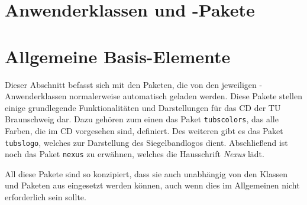 


\tableofcontents


\newcommand{\newdocumentclass}[1]{\textcolor{tuGreenDark}{\lstinline{#1}}}
\newcommand{\newpackage}[1]{\textcolor{tuGreenDark}{\lstinline{#1}}}





\part{Anwenderklassen und -Pakete}\label{part:user}







\part{Allgemeine Basis-Elemente}\label{part:base}

Dieser Abschnitt befasst sich mit den Paketen, die von den jeweiligen
\tubslatex-Anwender\-klassen normalerweise automatisch geladen werden.
Diese Pakete stellen einige grundlegende Funktionalitäten und Darstellungen
für das \acs{CD} der TU Braunschweig dar. Dazu gehören zum einen das Paket
\newpackage{tubscolors}, das alle Farben, die im \acs{CD} vorgesehen sind,
definiert. Des weiteren gibt es das Paket \newpackage{tubslogo}, welches
zur Darstellung des Siegelbandlogos dient. Abschließend ist noch das Paket
\newpackage{nexus} zu erwähnen, welches die Hausschrift \emph{Nexus}
lädt.

All diese Pakete sind so konzipiert, dass sie auch unabhängig von den
Klassen und Paketen aus \tubslatex eingesetzt werden können, auch wenn dies
im Allgemeinen nicht erforderlich sein sollte.

